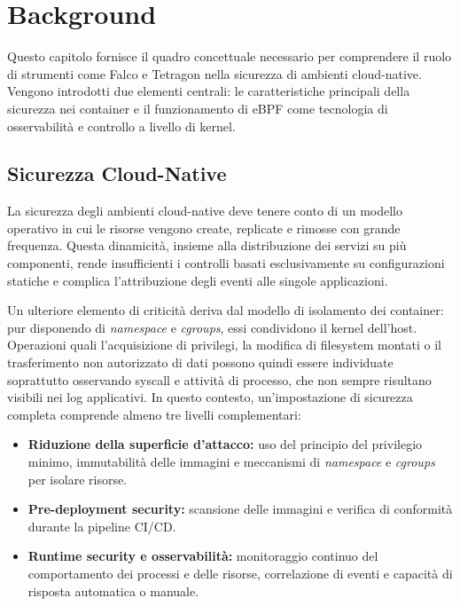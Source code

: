 \documentclass[12pt,a4paper,openright,twoside]{book}
\begin{document}
\chapter{Background}
\label{chap:background}

Questo capitolo fornisce il quadro concettuale necessario per comprendere il ruolo di strumenti come Falco e Tetragon nella sicurezza di ambienti cloud-native. Vengono introdotti due elementi centrali: le caratteristiche principali della sicurezza nei container e il funzionamento di eBPF come tecnologia di osservabilità e controllo a livello di kernel.

\section{Sicurezza Cloud-Native}
\label{sec:cloud-native-security}
La sicurezza degli ambienti cloud-native deve tenere conto di un modello operativo in cui le risorse vengono create, replicate e rimosse con grande frequenza. Questa dinamicità, insieme alla distribuzione dei servizi su più componenti, rende insufficienti i controlli basati esclusivamente su configurazioni statiche e complica l'attribuzione degli eventi alle singole applicazioni.

Un ulteriore elemento di criticità deriva dal modello di isolamento dei container: pur disponendo di \textit{namespace} e \textit{cgroups}, essi condividono il kernel dell'host. Operazioni quali l'acquisizione di privilegi, la modifica di filesystem montati o il trasferimento non autorizzato di dati possono quindi essere individuate soprattutto osservando syscall e attività di processo, che non sempre risultano visibili nei log applicativi. In questo contesto, un'impostazione di sicurezza completa comprende almeno tre livelli complementari:
\begin{itemize}
    \item \textbf{Riduzione della superficie d'attacco:} uso del principio del privilegio minimo, immutabilità delle immagini e meccanismi di \textit{namespace} e \textit{cgroups} per isolare risorse.
    \item \textbf{Pre-deployment security:} scansione delle immagini e verifica di conformità durante la pipeline CI/CD.
    \item \textbf{Runtime security e osservabilità:} monitoraggio continuo del comportamento dei processi e delle risorse, correlazione di eventi e capacità di risposta automatica o manuale.
\end{itemize}
\end{document}
